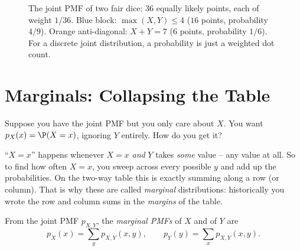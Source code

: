 \begin{figure}[H]
\centering
{}
\caption{The joint PMF of two fair dice: $36$ equally likely points, each of
weight $1/36$. Blue block: $\max(X,Y)\le 4$ ($16$ points, probability $4/9$).
Orange anti-diagonal: $X+Y=7$ ($6$ points, probability $1/6$). For a discrete
joint distribution, a probability is just a weighted dot count.}
\label{ch13:fig-dicegrid}
\end{figure}

\section{Marginals: Collapsing the Table}
\label{ch13:marginals}

Suppose you have the joint PMF but you only care about $X$. You want
$p_X(x) = \P(X=x)$, ignoring $Y$ entirely. How do you get it?

\begin{intuitionbox}
``$X=x$'' happens whenever $X=x$ \emph{and} $Y$ takes \emph{some} value -- any
value at all. So to find how often $X=x$, you sweep across every possible $y$ and
add up the probabilities. On the two-way table this is exactly summing along a
row (or column). That is why these are called \emph{marginal} distributions:
historically you wrote the row and column sums in the \emph{margins} of the
table.
\end{intuitionbox}

\begin{definition}
\label{ch13:def-marginal-pmf}
From the joint PMF $p_{X,Y}$, the \emph{marginal PMFs} of $X$ and of $Y$ are
\[
  p_X(x) = \sum_{y} p_{X,Y}(x,y), \qquad
  p_Y(y) = \sum_{x} p_{X,Y}(x,y).
\]
\end{definition}

